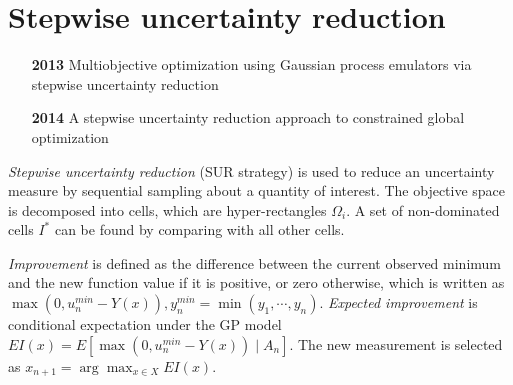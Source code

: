 \section{Stepwise uncertainty reduction}

\begin{itemize}
\item [\textbf{2013}] Multiobjective optimization using Gaussian process emulators via
stepwise uncertainty reduction~\cite{picheny2013multiobjective}
\item [\textbf{2014}] A stepwise uncertainty reduction approach to constrained global optimization~\cite{picheny2014stepwise}
\end{itemize}

\emph{Stepwise uncertainty reduction} (SUR strategy) is used to reduce an uncertainty measure by sequential sampling about a quantity of interest.
The objective space is decomposed into cells, which are hyper-rectangles $ \Omega_{i} $.
A set of non-dominated cells $ I^{*} $ can be found by comparing with all other cells.

\emph{Improvement} is defined as the difference between the current observed minimum and the new function value if it is positive, or zero otherwise, which is written as $ \max(0, u^{min}_{n}-Y(x)) , y^{min}_{n} = \min(y_{1}, \cdots , y_{n}) $.
\emph{Expected improvement} is conditional expectation under the GP model
$ EI(x) = E[ \max(0, u^{min}_{n}-Y(x)) \mid A_{n} ] $.
The new measurement is selected as $ x_{n+1} = \arg \max_{x \in X} EI(x) $.
